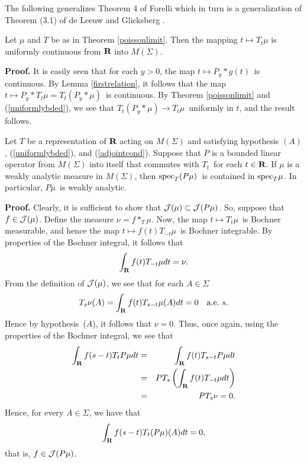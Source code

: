 \bigskip
The following generalizes Theorem 4 of Forelli \cite{forelli} 
which in turn is a generalization of Theorem (3.1) 
of de Leeuw and Glicksberg \cite{dg}.  
\begin{continuity}
Let $\mu$ and $T$ be as in Theorem \ref{poissonlimit}.  
Then the mapping $t\mapsto T_t\mu$ is uniformly continuous 
from $\R$ into $M(\Sigma)$.
\label{continuity}
\end{continuity}
{\bf Proof.}  It is easily seen that for each $y>0$, the map 
$t \mapsto P_y*g(t)$\ is 
continuous.  By
Lemma \ref{firstrelation}, it follows that the map $t \mapsto P_y*T_t\mu
= T_t(P_y*\mu)$\ is continuous.  By 
Theorem \ref{poissonlimit} and (\ref{uniformlybded}), we see that
$T_t(P_y*\mu) \to T_t\mu$\ uniformly in $t$, and the result follows.
\begin{corbigmaintheorem2}
Let $T$ be a representation of $\R$ acting on 
$M(\Sigma)$ and satisfying hypothesis $(A)$,
(\ref{uniformlybded}), and
(\ref{adjointcond}).  
Suppose that $P$ is 
a bounded linear operator from $M(\Sigma)$ into itself 
that commutes with $T_t$\ for each $t\in \R$.  If $\mu$ 
is a weakly analytic measure in $M(\Sigma)$, then
${\rm spec}_T(P\mu)$\ is contained in ${\rm spec}_T\mu$.  In
particular, $P\mu$\ is weakly analytic.
\label{corbigmaintheorem2}
\end{corbigmaintheorem2}
{\bf Proof.}  Clearly, it is sufficient to show that
${\cal J}(\mu) \subset {\cal J}(P\mu)$.  So, suppose that
$f \in {\cal J}(\mu)$.  Define the measure
$ \nu = f*_T \mu $.  Now, the map $t\mapsto T_t\mu$\ is Bochner 
measurable, and hence the map
$t\mapsto f(t) T_{-t}\mu$\ is Bochner integrable.  By properties of the
Bochner integral, it follows that
$$ \int_\R f(t) T_{-t} \mu dt = \nu .$$
From the definition of ${\cal J}(\mu)$, we see
that for each $A\in\Sigma$
$$ T_s\nu(A) = \int_\R f(t) T_{s-t}\mu(A) dt = 0 \quad\mbox{a.e.\ $s$.} $$
Hence by hypothesis~($A$), it follows that $\nu = 0$.
Thus, once again, using the properties of the Bochner integral, we see
that
\begin{eqnarray*}
\int_\R f(s-t) T_t P\mu dt
&=&
\int_\R f(t) T_{s-t} P\mu dt \\
&=& P T_s \left(\int_\R f(t) T_{-t} \mu dt\right) \\
&=& P T_s \nu = 0 .
\end{eqnarray*}
Hence, for every $A\in\Sigma$, we have that
$$ \int_\R f(s-t) T_t (P\mu)(A) dt = 0,$$
that is, $f \in {\cal J}(P\mu)$.

